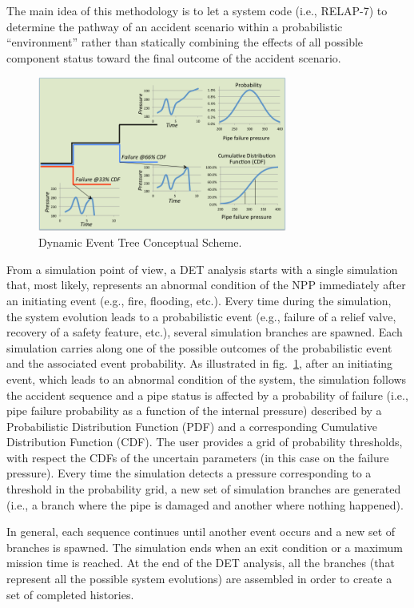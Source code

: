 The main idea of this methodology is to let a system code (i.e., RELAP-7) to determine the pathway of an accident scenario within a probabilistic “environment” rather than statically combining the effects of all possible component status toward the final outcome of the accident scenario.
\begin{figure}[h]
  \centering
     \includegraphics[width=0.73\textwidth]{figures/DET_schemeFlow.png}
  \caption{Dynamic Event Tree Conceptual Scheme.}
   \label{fig:DET_schemeFlow}
\end{figure}

From a simulation point of view, a DET analysis starts with a single simulation that, most likely, represents an abnormal condition of the NPP immediately after an initiating event (e.g., fire, flooding, etc.). Every time during the simulation, the system evolution leads to a probabilistic event (e.g., failure of a relief valve, recovery of a safety feature, etc.), several simulation branches are spawned. Each simulation carries along one of the possible outcomes of the probabilistic event and the associated event probability. As illustrated in fig.~\ref{fig:DET_schemeFlow}, after an initiating event, which leads to an abnormal condition of the system, the simulation follows the accident sequence and a pipe status is affected by a probability of failure (i.e., pipe failure probability as a function of the internal pressure) described by a Probabilistic Distribution Function (PDF) and a corresponding Cumulative Distribution Function (CDF). The user provides a grid of probability thresholds, with respect the CDFs of the uncertain parameters (in this case on the failure pressure). Every time the simulation detects a pressure corresponding to a threshold in the probability grid, a new set of simulation branches are generated (i.e., a branch where the pipe is damaged and another where nothing happened).

In general, each sequence continues until another event occurs and a new set of branches is spawned. The simulation ends when an exit condition or a maximum mission time is reached. At the end of the DET analysis, all the branches (that represent all the possible system evolutions) are assembled in order to create a set of completed histories.
